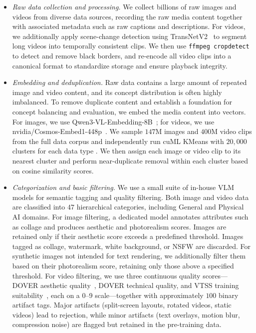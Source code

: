 \documentclass{llmxive}
\begin{document}
\begin{itemize}

\item \textit{Raw data collection and processing.} We collect billions of raw images and videos from diverse data sources, recording the raw media content together with associated metadata such as raw captions and descriptions. For videos, we additionally apply scene-change detection using TransNetV2~\citep{soucek2020transnetv2} to segment long videos into temporally consistent clips. We then use \texttt{ffmpeg cropdetect} to detect and remove black borders, and re-encode all video clips into a canonical format to standardize storage and ensure playback integrity.

\item \textit{Embedding and deduplication.} Raw data contains a large amount of repeated image and video content, and its concept distribution is often highly imbalanced. To remove duplicate content and establish a foundation for concept balancing and evaluation, we embed the media content into vectors. For images, we use Qwen3-VL-Embedding-8B~\citep{qwen3vlembedding}; for videos, we use nvidia/Cosmos-Embed1-448p~\citep{nvidia2025cosmosembed1}. We sample $147$M images and $400$M video clips from the full data corpus and independently run cuML KMeans with $20,000$ clusters for each data type \citep{cuml, kmeans}. We then assign each image or video clip to its nearest cluster and perform near-duplicate removal within each cluster based on cosine similarity scores.

\item \textit{Categorization and basic filtering.} We use a small suite of in-house VLM models for semantic tagging and quality filtering. Both image and video data are classified into $47$ hierarchical categories, including General and Physical AI domains. For image filtering, a dedicated model annotates attributes such as collage and produces aesthetic and photorealism scores. Images are retained only if their aesthetic score exceeds a predefined threshold. Images tagged as collage, watermark, white background, or NSFW are discarded. For synthetic images not intended for text rendering, we additionally filter them based on their photorealism score, retaining only those above a specified threshold. For video filtering, we use three continuous quality scores---DOVER aesthetic quality~\citep{dover}, DOVER technical quality, and VTSS training suitability~\citep{koala}, each on a 0--9 scale---together with approximately $100$ binary artifact tags. Major artifacts (split-screen layouts, rotated videos, static videos) lead to rejection, while minor artifacts (text overlays, motion blur, compression noise) are flagged but retained in the pre-training data.

\end{itemize}
\end{document}
